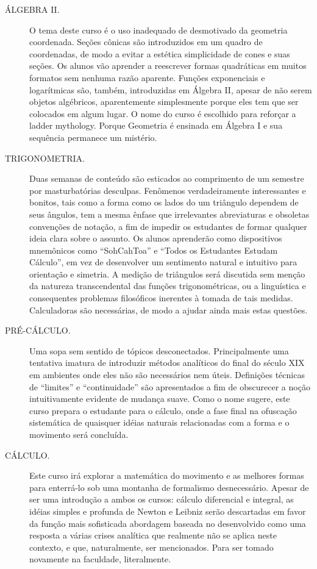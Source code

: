 \documentclass[a4paper,oneside,12pt,notitlepage]{article}
\begin{document}
\begin{description}
\item[ÁLGEBRA II.]
O tema deste curso é o uso inadequado de desmotivado da geometria coordenada.
Seções cônicas são introduzidos em um quadro de coordenadas, de modo a evitar a estética simplicidade de cones e suas seções.
Os alunos vão aprender a reescrever formas quadráticas em muitos formatos sem nenhuma razão aparente.
Funções exponenciais e logarítmicas são, também, introduzidas em Álgebra II, apesar de não serem objetos algébricos, aparentemente simplesmente porque eles tem que ser colocados em algum lugar.
O nome do curso é escolhido para reforçar a ladder mythology.
Porque Geometria é ensinada em Álgebra I e sua sequência permanece um mistério.

\item[TRIGONOMETRIA.]
Duas semanas de conteúdo são esticados ao comprimento de um semestre por masturbatórias desculpas.
Fenômenos verdadeiramente interessantes e bonitos, tais como a forma como os lados do um triângulo dependem de seus ângulos, tem a mesma ênfase que irrelevantes abreviaturas e obsoletas convenções de notação, a fim de impedir os estudantes de formar qualquer ideia clara sobre o assunto.
Os alunos aprenderão como dispositivos mnemônicos como ``SohCahToa'' e ``Todos os Estudantes Estudam Cálculo'', em vez de desenvolver um sentimento natural e intuitivo para orientação e simetria.
A medição de triângulos será discutida sem menção da natureza transcendental das funções trigonométricas, ou a linguística e consequentes problemas filosóficos inerentes à tomada de tais medidas.
Calculadoras são necessárias, de modo a ajudar ainda mais estas questões.

\item[PRÉ-CÁLCULO.]
Uma sopa sem sentido de tópicos desconectados.
Principalmente uma tentativa imatura de introduzir métodos analíticos do final do século XIX em ambientes onde eles não são necessários nem úteis.
Definições técnicas de ``limites'' e ``continuidade'' são apresentados a fim de obscurecer a noção intuitivamente evidente de mudança suave.
Como o nome sugere, este curso prepara o estudante para o cálculo, onde a fase final na ofuscação sistemática de quaisquer idéias naturais relacionadas com a forma e o movimento será concluída.

\item[CÁLCULO.]
Este curso irá explorar a matemática do movimento e as melhores formas para enterrá-lo sob uma montanha de formalismo desnecessário.
Apesar de ser uma introdução a ambos os cursos: cálculo diferencial e integral, as idéias simples e profunda de Newton e Leibniz serão descartadas em favor da função mais sofisticada abordagem baseada no desenvolvido como uma resposta a várias crises analítica que realmente não se aplica neste contexto, e que, naturalmente, ser mencionados.
Para ser tomado novamente na faculdade, literalmente. 
\end{description}
\end{document}
